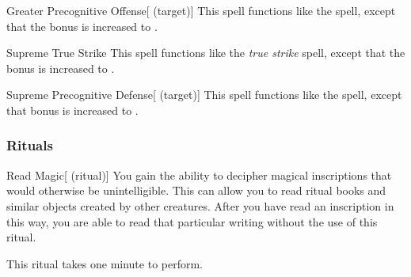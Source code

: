 \lowercase{\hypertarget{spell:Greater Precognitive Offense}{}}\label{spell:Greater Precognitive Offense}
\begin{attuneability}[\nth{5}]{\hypertarget{spell:Greater Precognitive Offense}{Greater Precognitive Offense}}[ (target)]
This spell functions like the  spell, except that the bonus is increased to .
\end{attuneability}
\vspace{0.25em}



\lowercase{\hypertarget{spell:Supreme True Strike}{}}\label{spell:Supreme True Strike}
\begin{apability}[\nth{5}]{\hypertarget{spell:Supreme True Strike}{Supreme True Strike}}
This spell functions like the \textit{true strike} spell, except that the bonus is increased to .
\end{apability}
\vspace{0.25em}



\lowercase{\hypertarget{spell:Supreme Precognitive Defense}{}}\label{spell:Supreme Precognitive Defense}
\begin{attuneability}[\nth{7}]{\hypertarget{spell:Supreme Precognitive Defense}{Supreme Precognitive Defense}}[ (target)]
This spell functions like the  spell, except that bonus is increased to .
\end{attuneability}
\vspace{0.25em}



\subsubsection{Rituals}


\lowercase{\hypertarget{spell:Read Magic}{}}\label{spell:Read Magic}
\begin{attuneability}[\nth{1}]{\hypertarget{spell:Read Magic}{Read Magic}}[ (ritual)]
You gain the ability to decipher magical inscriptions that would otherwise be unintelligible.
This can allow you to read ritual books and similar objects created by other creatures.
After you have read an inscription in this way, you are able to read that particular writing without the use of this ritual.

This ritual takes one minute to perform.
\end{attuneability}
\vspace{0.25em}



